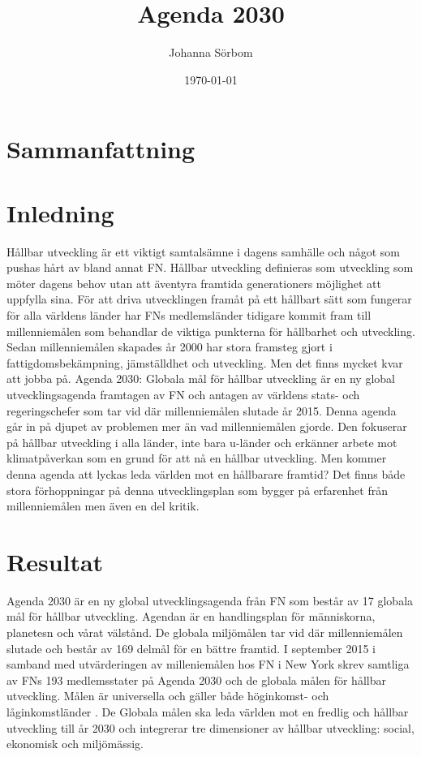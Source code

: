 \documentclass{report}
\title{Agenda 2030}
\date{\today}
\author{Johanna Sörbom}
\begin{document}
\maketitle
\newpage
\tableofcontents
\newpage
\section*{Sammanfattning}
\newpage
\section{Inledning}
Hållbar utveckling är ett viktigt samtalsämne i dagens samhälle och något som pushas hårt av bland annat FN. Hållbar utveckling definieras som utveckling som möter dagens behov utan att äventyra framtida generationers möjlighet att uppfylla sina.\cite{web2030agenda}
För att driva utvecklingen framåt på ett hållbart sätt som fungerar för alla världens länder har FNs medlemsländer tidigare kommit fram till millenniemålen som behandlar de viktiga punkterna för hållbarhet och utveckling.  Sedan millenniemålen skapades år 2000 har stora framsteg gjort i fattigdomsbekämpning, jämställdhet och utveckling. Men det finns mycket kvar att jobba på. \cite{webEuropeanComission}
Agenda 2030: Globala mål för hållbar utveckling är en ny global utvecklingsagenda framtagen av FN och antagen av världens stats- och regeringschefer som tar vid där millenniemålen slutade år 2015. Denna agenda går in på djupet av problemen mer än vad millenniemålen gjorde. Den fokuserar på hållbar utveckling i alla länder, inte bara u-länder och erkänner arbete mot klimatpåverkan som en grund för att nå en hållbar utveckling. Men kommer denna agenda att lyckas leda världen mot en hållbarare framtid? Det finns både stora förhoppningar på denna utvecklingsplan som bygger på erfarenhet från millenniemålen men även en del kritik. 

\section{Resultat}
Agenda 2030 är en ny global utvecklingsagenda från FN som består av 17 globala mål för hållbar utveckling. \cite{webUNASweden} Agendan\cite{nam2015transforming} är en handlingsplan för människorna, planetesn och vårat välstånd. De globala miljömålen tar vid där millenniemålen slutade och består av 169 delmål för en bättre framtid. I september 2015 i samband med utvärderingen av milleniemålen hos FN i New York skrev samtliga av FNs 193 medlemsstater på Agenda 2030 och de globala målen för hållbar utveckling. \cite{webUNASweden} Målen är universella och gäller både höginkomst- och låginkomstländer \cite{webUNDP}. De Globala målen ska leda världen mot en fredlig och hållbar utveckling till år 2030 och integrerar tre dimensioner av hållbar utveckling: social, ekonomisk och miljömässig.  \cite{UNA Sweden}
\end{document}
